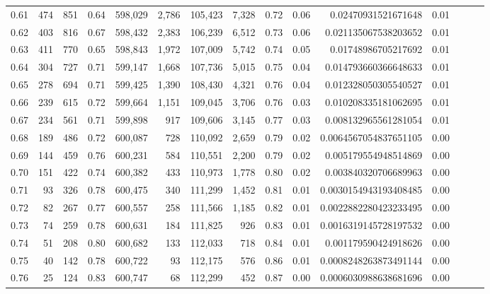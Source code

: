 \begin{tabular}{rrrrrrrrrrrrrrr}
0.61 &     474 &    851 &  0.64 &  598,029 &    2,786 &  105,423 &    7,328 &  0.72 &  0.06 &     0.02470931521671648 &      0.01 \\
0.62 &     403 &    816 &  0.67 &  598,432 &    2,383 &  106,239 &    6,512 &  0.73 &  0.06 &    0.021135067538203652 &      0.01 \\
0.63 &     411 &    770 &  0.65 &  598,843 &    1,972 &  107,009 &    5,742 &  0.74 &  0.05 &     0.01748986705217692 &      0.01 \\
0.64 &     304 &    727 &  0.71 &  599,147 &    1,668 &  107,736 &    5,015 &  0.75 &  0.04 &    0.014793660366648633 &      0.01 \\
0.65 &     278 &    694 &  0.71 &  599,425 &    1,390 &  108,430 &    4,321 &  0.76 &  0.04 &    0.012328050305540527 &      0.01 \\
0.66 &     239 &    615 &  0.72 &  599,664 &    1,151 &  109,045 &    3,706 &  0.76 &  0.03 &    0.010208335181062695 &      0.01 \\
0.67 &     234 &    561 &  0.71 &  599,898 &      917 &  109,606 &    3,145 &  0.77 &  0.03 &    0.008132965561281054 &      0.01 \\
0.68 &     189 &    486 &  0.72 &  600,087 &      728 &  110,092 &    2,659 &  0.79 &  0.02 &   0.0064567054837651105 &      0.00 \\
0.69 &     144 &    459 &  0.76 &  600,231 &      584 &  110,551 &    2,200 &  0.79 &  0.02 &    0.005179554948514869 &      0.00 \\
0.70 &     151 &    422 &  0.74 &  600,382 &      433 &  110,973 &    1,778 &  0.80 &  0.02 &    0.003840320706689963 &      0.00 \\
0.71 &      93 &    326 &  0.78 &  600,475 &      340 &  111,299 &    1,452 &  0.81 &  0.01 &   0.0030154943193408485 &      0.00 \\
0.72 &      82 &    267 &  0.77 &  600,557 &      258 &  111,566 &    1,185 &  0.82 &  0.01 &   0.0022882280423233495 &      0.00 \\
0.73 &      74 &    259 &  0.78 &  600,631 &      184 &  111,825 &      926 &  0.83 &  0.01 &   0.0016319145728197532 &      0.00 \\
0.74 &      51 &    208 &  0.80 &  600,682 &      133 &  112,033 &      718 &  0.84 &  0.01 &    0.001179590424918626 &      0.00 \\
0.75 &      40 &    142 &  0.78 &  600,722 &       93 &  112,175 &      576 &  0.86 &  0.01 &   0.0008248263873491144 &      0.00 \\
0.76 &      25 &    124 &  0.83 &  600,747 &       68 &  112,299 &      452 &  0.87 &  0.00 &   0.0006030988638681696 &      0.00 \\

\end{tabular}

